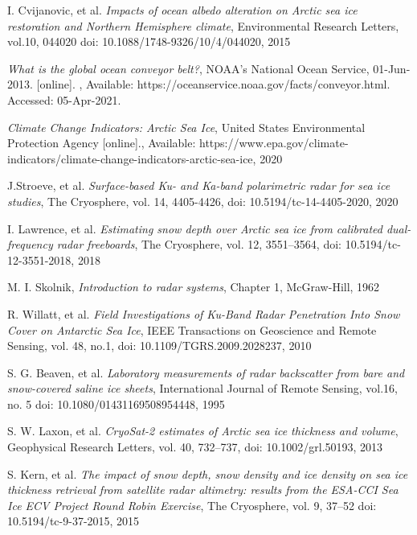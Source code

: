 \documentclass[11pt, a4paper]{article}
\begin{document}
\hfill
{}
\begin{thebibliography}{9}

	 I. Cvijanovic,  et al.
	 \textit{Impacts of ocean albedo alteration on Arctic sea ice restoration and Northern Hemisphere climate},
	 Environmental Research Letters, vol.10,  044020
	 doi: 10.1088/1748-9326/10/4/044020,
	 2015
	 
	\textit{What is the global ocean conveyor belt?},
	NOAA's National Ocean Service, 01-Jun-2013. [online]. ,
	Available: https://oceanservice.noaa.gov/facts/conveyor.html. 
	Accessed: 05-Apr-2021.
	 
	\textit{Climate Change Indicators: Arctic Sea Ice},
	United States Environmental Protection Agency [online].,
	Available: https://www.epa.gov/climate-indicators/climate-change-indicators-arctic-sea-ice,
	2020

	J.Stroeve, et al.
	\textit{Surface-based Ku- and Ka-band polarimetric radar for sea ice studies},
	The Cryosphere, vol. 14, 4405-4426,
	doi: 10.5194/tc-14-4405-2020,
	2020
	
	I. Lawrence, et al.
	\textit{Estimating snow depth over Arctic sea ice from calibrated dual-frequency radar freeboards},
	The Cryosphere, vol. 12, 3551–3564,
	doi: 10.5194/tc-12-3551-2018,
	2018
	 
	M. I. Skolnik, 
	\textit{Introduction to radar systems}, Chapter 1,
	McGraw-Hill, 
	1962
	    
	R. Willatt, et al.
	\textit{Field Investigations of Ku-Band Radar Penetration Into Snow Cover on Antarctic Sea Ice},
	 IEEE Transactions on Geoscience and Remote Sensing, vol. 48, no.1,
	 doi: 10.1109/TGRS.2009.2028237,
	 2010
 	
    S. G. Beaven, et al.
    \textit{Laboratory measurements of radar backscatter from bare and snow-covered saline ice sheets},
    International Journal of Remote Sensing, vol.16, no. 5
    doi: 10.1080/01431169508954448,
    1995
    		 
	S. W. Laxon, et al.
	\textit{CryoSat-2 estimates of Arctic sea ice thickness and volume},
	Geophysical Research Letters, vol. 40, 732–737,
	doi: 10.1002/grl.50193,
	2013
	
	S. Kern, et al.
	\textit{The impact of snow depth, snow density and ice density on sea ice thickness retrieval from satellite radar     altimetry: results from the ESA-CCI Sea Ice ECV Project Round Robin Exercise},
	The Cryosphere, vol. 9, 37–52
	doi: 10.5194/tc-9-37-2015,
	2015


\end{thebibliography}
\end{document}
